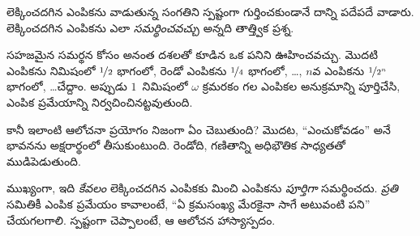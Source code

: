 \documentclass[../../../include/open-logic-section]{subfiles}
\begin{document}
లెక్కించదగిన ఎంపికను వాడుతున్న సంగతిని స్పష్టంగా గుర్తించకుండానే
దాన్ని పదేపదే వాడారు. లెక్కించదగిన ఎంపికను ఎలా
\emph{సమర్థించవచ్చు} అన్నది తాత్త్విక ప్రశ్న.

సహజమైన సమర్థన కోసం అనంత దశలతో కూడిన ఒక పనిని ఊహించవచ్చు.
మొదటి ఎంపికను నిమిషంలో $\nicefrac{1}{2}$ భాగంలో,
రెండో ఎంపికను $\nicefrac{1}{4}$ భాగంలో, \dots,
$n$వ ఎంపికను $\nicefrac{1}{2^n}$ భాగంలో, \dots\@ చేద్దాం.
అప్పుడు $1$~నిమిషంలో $\omega$ క్రమరకం గల ఎంపికల
అనుక్రమాన్ని పూర్తిచేసి, ఎంపిక ప్రమేయాన్ని నిర్వచించినట్టవుతుంది.

కానీ ఇలాంటి ఆలోచనా ప్రయోగం నిజంగా ఏం చెబుతుంది? మొదట, ``ఎంచుకోవడం'' అనే భావనను అక్షరార్థంలో తీసుకుంటుంది. రెండోది, గణితాన్ని అధిభౌతిక సాధ్యతతో ముడిపెడుతుంది.

ముఖ్యంగా, ఇది \emph{కేవలం} లెక్కించదగిన ఎంపికకు మించి ఎంపికను \emph{పూర్తిగా} సమర్థించదు. \emph{ప్రతి} సమితికీ ఎంపిక ప్రమేయం కావాలంటే, ``ఏ క్రమసంఖ్య మేరకైనా సాగే అటువంటి పని'' చేయగలగాలి. స్పష్టంగా చెప్పాలంటే, ఆ ఆలోచన హాస్యాస్పదం.
\end{document}
